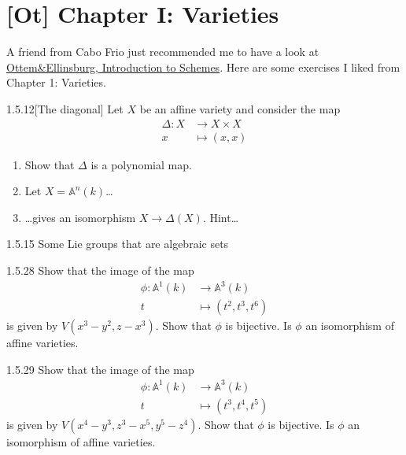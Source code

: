 \iffalse
\section{[Ot] Chapter I: Varieties}

A friend from Cabo Frio just recommended me to have a look at \href{https://www.uio.no/studier/emner/matnat/math/MAT4215/data/masteragbook.pdf}{Ottem\&Ellinsburg, Introduction to Schemes}. Here are some exercises I liked from Chapter 1: Varieties.

\begin{manualexercise}{1.5.12}[The diagonal]
	Let $X$ be an affine variety and consider the map
	\begin{align*}
		\Delta: X &\longrightarrow X\times X \\
		x &\longmapsto (x,x)
	\end{align*}
	\begin{enumerate}[label=\alph*.]
		\item Show that $\Delta$ is a polynomial map.
		\item Let $X=\mathbb{A}^{n}(k)$…
		\item …gives an isomorphism $X\to \Delta(X)$. Hint…
	\end{enumerate}
\end{manualexercise}

\begin{manualexercise}{1.5.15}
{\color{magenta}Some Lie groups that are algebraic sets}
\end{manualexercise}

\begin{manualexercise}{1.5.28}
	Show that the image of the map
	\begin{align*}
		\phi: \mathbb{A}^{1}(k) &\longrightarrow \mathbb{A}^{3}(k) \\
		t &\longmapsto (t^{2},t^{3},t^{6})
	\end{align*}
	is given by $V(x^{3}-y^{2},z-x^{3})$. Show that $\phi$ is bijective. Is $\phi$ an isomorphism of affine varieties.
\end{manualexercise}

\begin{manualexercise}{1.5.29}
	Show that the image of the map
	\begin{align*}
		\phi: \mathbb{A}^{1}(k) &\longrightarrow \mathbb{A}^{3}(k) \\
		t &\longmapsto (t^{3},t^{4},t^{5})
	\end{align*}
	is given by $V(x^{4}-y^{3},z^{3}-x^{5},y^{5}-z^{4})$. Show that $\phi$ is bijective. Is $\phi$ an isomorphism of affine varieties.
\end{manualexercise}

